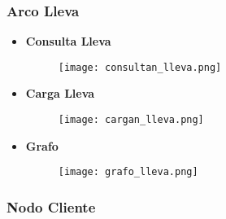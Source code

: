 \documentclass[a4paper]{article}
\begin{document}
\subsubsection{\Large{Arco Lleva}}

\begin{itemize}

    \item \textbf{\large{Consulta Lleva}}

    \begin{figure}[H]
        \centering
        \texttt{[image: consultan\_lleva.png]}
        \label{fig:consultan_lleva}
    \end{figure}

    \item \textbf{\large{Carga Lleva}}

    \begin{figure}[H]
        \centering
        \texttt{[image: cargan\_lleva.png]}
        \label{fig:cargan_lleva}
    \end{figure}

\newpage

    \item \textbf{\large{Grafo}}

    \begin{figure}[H]
        \centering
        \texttt{[image: grafo\_lleva.png]}
        \label{fig:grafo_lleva}
    \end{figure}

\end{itemize}

\subsubsection{\Large{Nodo Cliente}}
\end{document}
